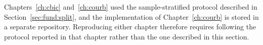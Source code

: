 Chapters~\ref{ch:cbic} and~\ref{ch:courb} used the sample-stratified protocol described
in Section~\ref{sec:fund:split}, and the implementation of Chapter~\ref{ch:courb} is stored in
a separate repository. Reproducing either chapter therefore requires following the
protocol reported in that chapter rather than the one described in this section.
